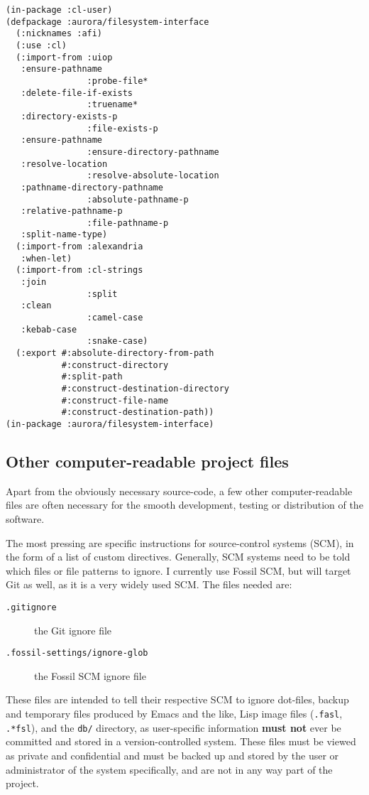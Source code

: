 \documentclass{article}
\begin{document}
\begin{verbatim}
(in-package :cl-user)
(defpackage :aurora/filesystem-interface
  (:nicknames :afi)
  (:use :cl)
  (:import-from :uiop
   :ensure-pathname
                :probe-file*
   :delete-file-if-exists
                :truename*
   :directory-exists-p
                :file-exists-p
   :ensure-pathname
                :ensure-directory-pathname
   :resolve-location
                :resolve-absolute-location
   :pathname-directory-pathname
                :absolute-pathname-p
   :relative-pathname-p
                :file-pathname-p
   :split-name-type)
  (:import-from :alexandria
   :when-let)
  (:import-from :cl-strings
   :join
                :split
   :clean
                :camel-case
   :kebab-case
                :snake-case)
  (:export #:absolute-directory-from-path
           #:construct-directory
           #:split-path
           #:construct-destination-directory
           #:construct-file-name
           #:construct-destination-path))
(in-package :aurora/filesystem-interface)
\end{verbatim}

\subsection{Other computer-readable project files}
\label{sec:orge2389cf}

Apart from the obviously necessary source-code, a few other computer-readable
files are often necessary for the smooth development, testing or distribution of
the software. 

The most pressing are specific instructions for source-control systems (SCM), in the
form of a list of custom directives. Generally, SCM systems need to be told
which files or file patterns to ignore. I currently use Fossil SCM, but will
target Git as well, as it is a very widely used SCM. The files needed are:

\begin{description}
\item[{\texttt{.gitignore}}] the Git ignore file
\item[{\texttt{.fossil-settings/ignore-glob}}] the Fossil SCM ignore file
\end{description}

These files are intended to tell their respective SCM to ignore dot-files,
backup and temporary files produced by Emacs and the like, Lisp image files
(\texttt{.fasl}, \texttt{.*fsl}), and the \texttt{db/} directory, as user-specific information \textbf{must
not} ever be committed and stored in a version-controlled system. These files
must be viewed as private and confidential and must be backed up and stored by
the user or administrator of the system specifically, and are not in any way
part of the project.
\end{document}
